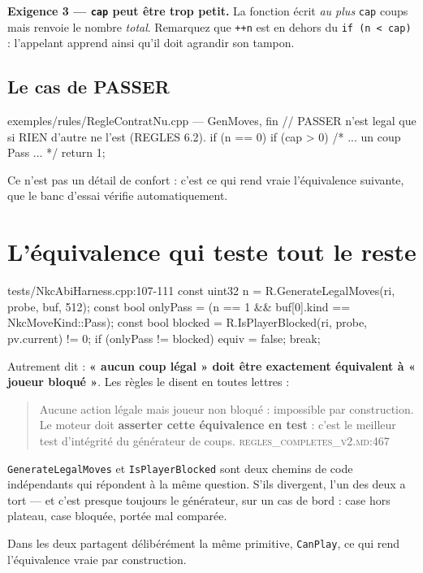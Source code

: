 \textbf{Exigence 3 — \texttt{cap} peut être trop petit.} La fonction écrit
\emph{au plus} \texttt{cap} coups mais renvoie le nombre \emph{total}. Remarquez
que \texttt{++n} est en dehors du \texttt{if (n < cap)} : l'appelant apprend ainsi
qu'il doit agrandir son tampon.

\subsection{Le cas de PASSER}

\begin{nkcode}{exemples/rules/RegleContratNu.cpp — GenMoves, fin}
// PASSER n'est legal que si RIEN d'autre ne l'est (REGLES 6.2).
if (n == 0) {
    if (cap > 0) { /* ... un coup Pass ... */ }
    return 1;
}
\end{nkcode}

Ce n'est pas un détail de confort : c'est ce qui rend vraie l'équivalence
suivante, que le banc d'essai vérifie automatiquement.

\section{L'équivalence qui teste tout le reste}

\begin{nkcode}{tests/NkcAbiHarness.cpp:107-111}
const uint32 n = R.GenerateLegalMoves(ri, probe, buf, 512);
const bool onlyPass = (n == 1 && buf[0].kind == NkcMoveKind::Pass);
const bool blocked  = R.IsPlayerBlocked(ri, probe, pv.current) != 0;
if (onlyPass != blocked) { equiv = false; break; }
\end{nkcode}

Autrement dit : \textbf{« aucun coup légal » doit être exactement équivalent à
« joueur bloqué »}. Les règles le disent en toutes lettres :

\begin{quote}\small
Aucune action légale mais joueur non bloqué : impossible par construction. Le
moteur doit \textbf{asserter cette équivalence en test} : c'est le meilleur test
d'intégrité du générateur de coups.
\hfill\textsc{regles\_completes\_v2.md:467}
\end{quote}

\begin{nkretenir}
\texttt{GenerateLegalMoves} et \texttt{IsPlayerBlocked} sont deux chemins de code
indépendants qui répondent à la même question. S'ils divergent, l'un des deux a
tort — et c'est presque toujours le générateur, sur un cas de bord : case hors
plateau, case bloquée, portée mal comparée.

Dans  les deux partagent délibérément la même
primitive, \texttt{CanPlay}, ce qui rend l'équivalence vraie par construction.
\end{nkretenir}

